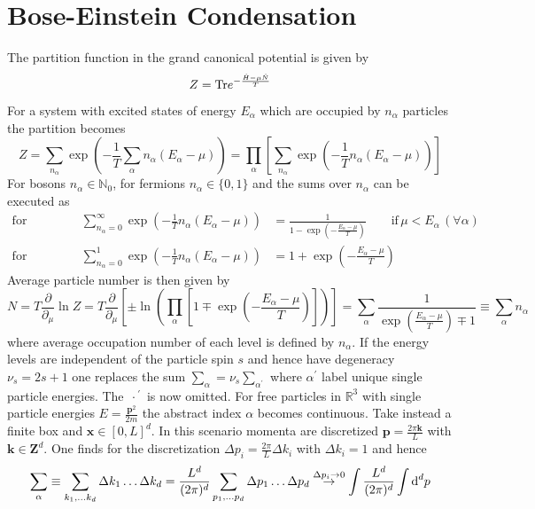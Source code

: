 \section{Bose-Einstein Condensation}

The partition function in the grand canonical potential is given by
\begin{equation}
    Z={\text{Tr}} e^{-\frac{\hat{H}-\mu\hat{N}}{T}}
\end{equation}
For a system with excited states of energy $E_\alpha$ which are occupied by $n_\alpha$ particles the partition becomes
\begin{equation}
    Z=\sum_{n_\alpha}\exp\left(-\frac{1}{T}\sum_\alpha n_\alpha(E_\alpha-\mu)\right)=\prod_\alpha\left[\sum_{n_\alpha}\exp\left(-\frac{1}{T}n_\alpha(E_\alpha-\mu)\right)\right]
\end{equation}
For bosons $n_\alpha\in\mathbb{N}_0$, for fermions $n_\alpha\in\{0,1\}$ and the sums over $n_\alpha$ can be executed as
\begin{subequations}
    \begin{align}
        \text{for bosons:}   &  & \sum_{n_\alpha=0}^\infty \exp\left(-\frac{1}{T}n_\alpha(E_\alpha-\mu)\right) & = \frac{1}{1-\exp(-\frac{E_\alpha-\mu}{T})} \qquad\text{if}\,\mu <E_\alpha\,(\forall\alpha) \\
        \text{for fermions:} &  & \sum_{n_\alpha=0}^1 \exp\left(-\frac{1}{T}n_\alpha(E_\alpha-\mu)\right)      & = 1+\exp(-\frac{E_\alpha-\mu}{T})
    \end{align}
\end{subequations}
Average particle number is then given by
\begin{equation}
    N=T\frac{\partial}{\partial_\mu}\ln Z=T\frac{\partial}{\partial_\mu}\left[\pm\ln\left(\prod_\alpha\left[1\mp\exp\left(-\frac{E_\alpha-\mu}{T}\right)\right]\right)\right]=\sum_\alpha\frac{1}{\exp\left(\frac{E_\alpha-\mu}{T}\right)\mp 1}\equiv\sum_\alpha n_\alpha
\end{equation}
where average occupation number of each level is defined by $n_\alpha$. If the energy levels are independent of the particle spin $s$ and hence have degeneracy $\nu_s=2s+1$ one replaces the sum $\sum_\alpha=\nu_s\sum_{\alpha^\prime}$ where $\alpha^\prime$ label unique single particle energies. The ${\,\cdot\,}^\prime$ is now omitted.
For free particles in $\mathbb{R}^3$ with single particle energies $E=\frac{\mathbf{p}^2}{2m}$ the abstract index $\alpha$ becomes continuous. Take instead a finite box and $\mathbf{x}\in[0,L]^d$. In this scenario momenta are discretized $\mathbf{p}=\frac{2\pi\mathbf{k}}{L}$ with $\mathbf{k}\in\mathbf{Z}^d$. One finds for the discretization $\Delta p_i=\frac{2\pi}{L}\Delta k_i$ with $\Delta k_i=1$ and hence
\begin{equation}
    \sum_\alpha\equiv\sum_{k_1,\dots k_d}\Delta k_1\dots\Delta k_d=\frac{L^d}{(2\pi)^d}\sum_{p_1,\dots p_d}\Delta p_1\dots\Delta p_d\overset{\Delta p_i\to 0}{\to}\int\frac{L^d}{(2\pi)^d}\int\text{d}^dp
\end{equation}

